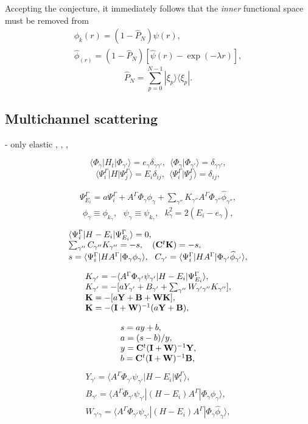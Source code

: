 \documentclass[aip
, pra
, showpacs
, aps
, twocolumn
, groupedaddress
, floatfix
]{revtex4}
\newcommand{\beq}{\begin{equation}}
\newcommand{\eeq}{\end{equation}}
\newcommand{\barr}{\begin{array}}
\newcommand{\earr}{\end{array}}
\begin{document}
Accepting the conjecture, it immediately follows that the {\em inner} functional space must be removed from
\beq \barr{l}
\phi_k(r) = (1-\hat{P}_N) \psi(r),\\
\widehat{\phi}_(r) = (1-\hat{P}_N) [\widehat{\psi}(r) - \exp{(-\lambda r)}],
\earr \eeq
\beq
\hat{P}_N = \sum_{p=0}^{N-1} | \xi_p \rangle \langle \xi_p |.
\eeq



\subsection{Multichannel scattering}
\cite{CA73} - only elastic
\cite{NO72},
\cite{TF79},
\cite{Nesbet78}, \cite{Lucchese86}

\beq
\langle \Phi_\gamma|H_t|\Phi_{\gamma'}\rangle=e_\gamma \delta_{\gamma\gamma'}, \ \
 \langle \Phi_\gamma|\Phi_{\gamma'}\rangle=\delta_{\gamma\gamma'},
 \label{psi_H_psi} \eeq
\beq
\langle\Psi_i^\Gamma|H|\Psi_j^\Gamma\rangle=E_i\delta_{ij}, \ \
 \langle\Psi_i^\Gamma|\Psi_j^\Gamma\rangle=\delta_{ij},
\label{Psi_H_Psi} \eeq


\beq \barr{l}
 \Psi_{E_i}^{\Gamma}  =  a \Psi_i^{\Gamma}
 + A^{\Gamma} \Phi_{\gamma}  \phi_{\gamma}
+ \sum_{\gamma''} K_{\gamma''} A^{\Gamma} \Phi_{\gamma''}   \widehat{\phi}_{\gamma''} ,
\earr \label{Psi_} \eeq
\beq
\phi_{\gamma}\equiv \phi_{k_\gamma}, \ \ \ \psi_{\gamma}\equiv \psi_{k_\gamma}, \ \ \   k_{\gamma}^2 = 2(E_i - e_\gamma),
\eeq


\beq \barr{l}
\langle\Psi_i^\Gamma|H-E_i|\Psi_{E_i}^{\Gamma}\rangle=0,\\
\sum_{\gamma''}  C_{\gamma''} K_{\gamma''}  = -s
, \ \ \ ({\bf C}^t {\bf K}) = -s,\\
s = \langle \Psi_i^\Gamma |HA^{\Gamma} |\Phi_{\gamma} \phi_{\gamma} \rangle,\ \
C_{\gamma'} =  \langle \Psi_i^\Gamma |HA^{\Gamma} |\Phi_{\gamma'} \widehat{\phi}_{\gamma'} \rangle,
\earr \label{Psi_} \eeq

\beq \barr{l}
K_{\gamma'} = - \langle A^{\Gamma} \Phi_{\gamma'}  \psi_{\gamma'}
| H-E_i | \Psi_{E_i}^{ \Gamma} \rangle,\\
K_{\gamma'} =   - [a Y_{\gamma'}   + B_{\gamma'}
+ \sum_{\gamma''}  W_{\gamma' \gamma''} K_{\gamma''}],\\
{\bf K} =   -[a {\bf Y} + {\bf B} + {\bf W K}],\\
{\bf K}  = -({\bf I}+{\bf W})^{-1}   (a {\bf Y}    + {\bf B}),
\earr \eeq

\beq \barr{l}
s = a y  + b,   \\
a = (s - b) / y,\\
y = {\bf C}^t ({\bf I}+{\bf W})^{-1}  {\bf Y}, \\
b = {\bf C}^t ({\bf I}+{\bf W})^{-1}  {\bf B},
\earr \eeq
\beq \barr{l}
Y_{\gamma'} = \langle A^{\Gamma} \Phi_{\gamma'}  \psi_{\gamma'} |H - E_i |\Psi_i^{\Gamma} \rangle,\\
B_{\gamma'} = \langle A^{\Gamma} \Phi_{\gamma'}  \psi_{\gamma'} |(H - E_i) A^{\Gamma} |\Phi_{\gamma} \phi_{\gamma} \rangle,\\
W_{\gamma' \gamma} = \langle A^{\Gamma} \Phi_{\gamma'}  \psi_{\gamma'} |(H - E_i) A^{\Gamma} |\Phi_{\gamma} \widehat{\phi}_{\gamma} \rangle,\\
\earr \label{Psi_} \eeq
\end{document}
